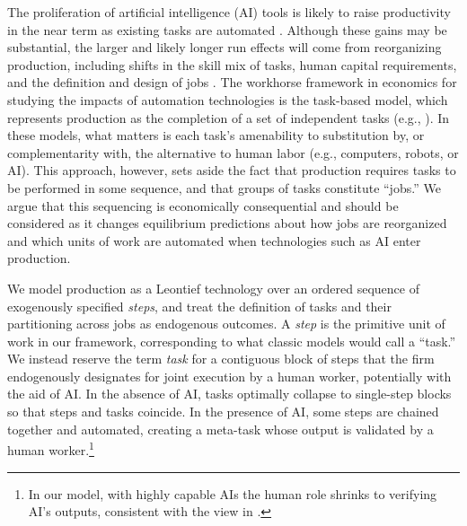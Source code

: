 The proliferation of artificial intelligence (AI) tools is likely to raise productivity in the near term as existing tasks are automated \citep{noy2023experimental, brynjolfsson2023generative, demirer2026writing}.
Although these gains may be substantial, the larger and likely longer run effects will come from reorganizing production, including shifts in the skill mix of tasks, human capital requirements, and the definition and design of jobs \citep{brynjolfsson2021productivity}. 
The workhorse framework in economics for studying the impacts of automation technologies is the task-based model, which represents production as the completion of a set of independent tasks (e.g., \citealp{autor2003skill, acemoglu2011skills, acemoglu2018, acemoglu2019automation, acemoglu2022tasks}). 
In these models, what matters is each task's amenability to substitution by, or complementarity with, the alternative to human labor (e.g., computers, robots, or AI). 
This approach, however, sets aside the fact that production requires tasks to be performed in some sequence, and that groups of tasks constitute ``jobs.'' 
We argue that this sequencing is economically consequential and should be considered as it changes equilibrium predictions about how jobs are reorganized and which units of work are automated when technologies such as AI enter production. 

We model production as a Leontief technology over an ordered sequence of exogenously specified \emph{steps}, and treat the definition of tasks and their partitioning across jobs as endogenous outcomes.
A \emph{step} is the primitive unit of work in our framework, corresponding to what classic models would call a ``task.''
We instead reserve the term \emph{task} for a contiguous block of steps that the firm endogenously designates for joint execution by a human worker, potentially with the aid of AI.
In the absence of AI, tasks optimally collapse to single-step blocks so that steps and tasks coincide.  In the presence of AI, some steps are chained together and automated, creating a meta-task whose output is validated by a human worker.\footnote{
In our model, with highly capable AIs the human role shrinks to verifying AI's outputs, consistent with the view in \cite{agrawal2019exploring}.
}

